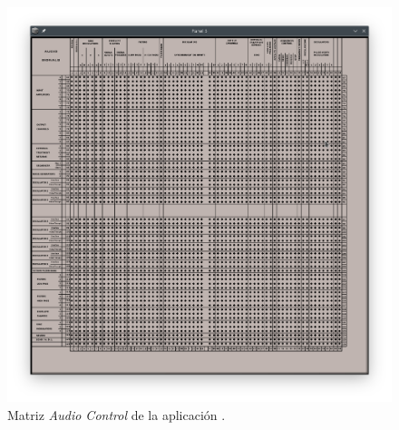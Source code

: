 \begin{figure}
	\centering
	\includegraphics[width=1\textwidth]{images/matriz_audio_synthigme}
	\caption[Matriz \textit{Audio Control} de la aplicación \appName]{Matriz \textit{Audio Control} de la aplicación \appName.}
	\label{fig:matriz_audio_synthigme}
\end{figure}